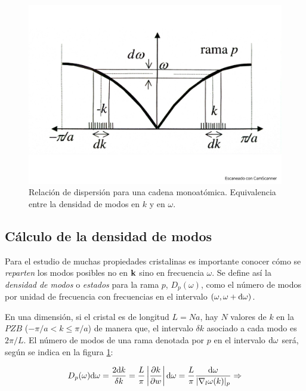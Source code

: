 \begin{figure}[h!] \centering
    \includegraphics[scale=0.43]{Cuerpo/Ch_05/Fotos libro 1.pdf}
    \caption{Relación de dispersión para una cadena monoatómica. Equivalencia entre la densidad de modos en $k$ y en $\omega$.}
    \label{Fig:05-01}
\end{figure}    


\subsection{Cálculo de la densidad de modos}

Para el estudio de muchas propiedades cristalinas es importante conocer cómo se \textit{reparten} los modos posibles no en $\mathbf{k}$ sino en frecuencia $\omega$. Se define así la \textit{densidad de modos} o \textit{estados} para la rama $p$, $D_p (\omega)$, como el número de modos por unidad de frecuencia con frecuencias en el intervalo $(\omega,\omega+\mathrm{d} \omega)$.

En una dimensión, si el cristal es de longitud $L=Na$, hay $N$ valores de $k$ en la $PZB$ ($-\pi/a < k\leq \pi/a$) de manera que, el intervalo $\delta k$ asociado a cada modo es $2 \pi / L$. El número de modos de una rama denotada por $p$ en el intervalo $\mathrm{d} \omega$ será, según se indica en la figura \ref{Fig:05-01}:

\begin{eqnarray*}
	D_p (\omega) \mathrm{d} \omega = \frac{2 \mathrm{d} k}{\delta k} = \frac{L}{\pi} \left| \frac{\partial k}{\partial w}  \right| \mathrm{d} \omega = \frac{L}{\pi} \frac{\mathrm{d} \omega}{|\nabla_l \omega (k)|_p} \Rightarrow
\end{eqnarray*} 

